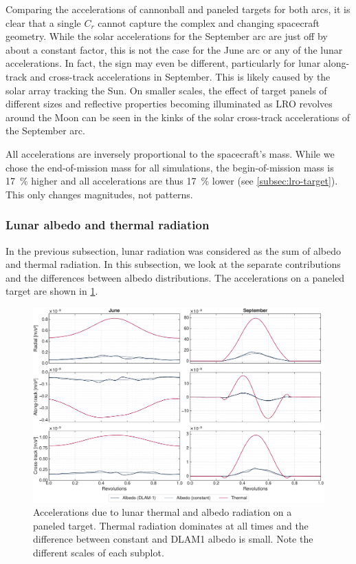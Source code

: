 Comparing the accelerations of cannonball and paneled targets for both arcs, it is clear that a single $C_r$ cannot capture the complex and changing spacecraft geometry. While the solar accelerations for the September arc are just off by about a constant factor, this is not the case for the June arc or any of the lunar accelerations. In fact, the sign may even be different, particularly for lunar along-track and cross-track accelerations in September. This is likely caused by the solar array tracking the Sun. On smaller scales, the effect of target panels of different sizes and reflective properties becoming illuminated as \gls{LRO} revolves around the Moon can be seen in the kinks of the solar cross-track accelerations of the September arc.

All accelerations are inversely proportional to the spacecraft's mass. While we chose the end-of-mission mass for all simulations, the begin-of-mission mass is \qty{17}{\percent} higher and all accelerations are thus \qty{17}{\percent} lower (see \cref{subsec:lro-target}). This only changes magnitudes, not patterns.





\subsubsection{Lunar albedo and thermal radiation}
In the previous subsection, lunar radiation was considered as the sum of albedo and thermal radiation. In this subsection, we look at the separate contributions and the differences between albedo distributions. The accelerations on a paneled target are shown in \cref{fig:acc-albedovsthermal}.

\begin{figure}[tb]
    \centering
    \includegraphics[width=\textwidth]{figures/plots/acc_albedovsthermal.pdf}

    \caption{Accelerations due to lunar thermal and albedo radiation on a paneled target. Thermal radiation dominates at all times and the difference between constant and \gls{DLAM1} albedo is small. Note the different scales of each subplot.}
    \label{fig:acc-albedovsthermal}
\end{figure}

